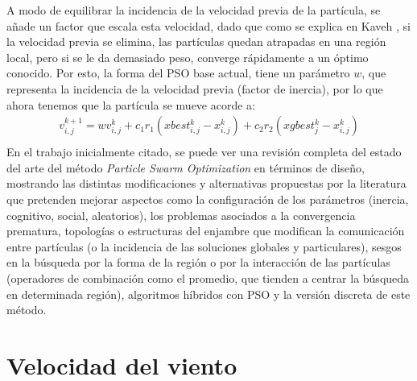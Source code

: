 A modo de equilibrar la incidencia de la velocidad previa de la partícula, se añade un factor que escala esta velocidad, dado que como se explica en Kaveh \cite{Psoexplain14}, si la velocidad previa se elimina, las partículas quedan atrapadas en una región local, pero si se le da demasiado peso, converge rápidamente a un óptimo conocido. Por esto, la forma del PSO base actual, tiene un parámetro $w$, que representa la incidencia de la velocidad previa (factor de inercia), por lo que ahora tenemos que la partícula se mueve acorde a: 
\begin{align}
    v_{i,j}^{k+1} = wv_{i,j}^{k} + c_{1}r_{1}(xbest_{i,j}^k - x_{i,j}^k) + c_{2}r_{2}(xgbest_{j}^{k} - x_{i,j}^k)\\
\end{align}    
En el trabajo inicialmente citado, se puede ver una revisión completa del estado del arte del método \emph{Particle Swarm Optimization} en términos de diseño, mostrando las distintas modificaciones y alternativas propuestas por la literatura que pretenden mejorar aspectos como la configuración de los parámetros (inercia, cognitivo, social, aleatorios), los problemas asociados a la convergencia prematura, topologías o estructuras del enjambre que modifican la comunicación entre partículas (o la incidencia de las soluciones globales y particulares), sesgos en la búsqueda por la forma de la región o por la interacción de las partículas (operadores de combinación como el promedio, que tienden a centrar la búsqueda en determinada región), algoritmos híbridos con PSO y la versión discreta de este método. 
\section{Velocidad del viento}
